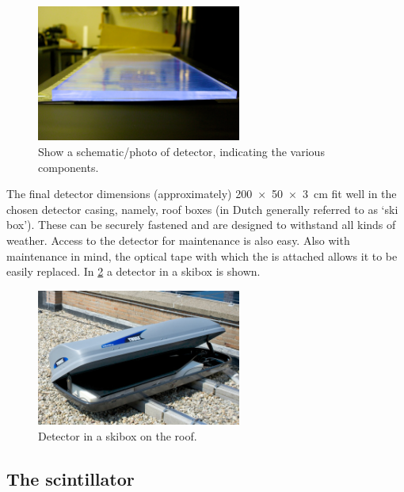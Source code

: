 \begin{figure}
    \centering
    \includegraphics[width=0.6\textwidth]
                    {plots/experiment/ADL_115651.jpg}
    \caption{Show a schematic/photo of detector, indicating the various components.}
    \label{fig:schematic_detector}
\end{figure}

The final detector dimensions (approximately) \SI[product-units=power]{200 x 50 x 3}{\centi\meter} fit well in the chosen detector casing, namely, roof boxes (in Dutch generally referred to as `ski box'). These can be securely fastened and are designed to withstand all kinds of weather. Access to the detector for maintenance is also easy. Also with maintenance in mind, the optical tape with which the \pmt is attached allows it to be easily replaced. In \cref{fig:detector_in_skibox} a detector in a skibox is shown.

\begin{figure}
    \centering
    \includegraphics[width=0.6\textwidth]
                    {plots/experiment/ADL_105036.jpg}
    \caption{Detector in a skibox on the roof.}
    \label{fig:detector_in_skibox}
\end{figure}

\subsection{The scintillator}

